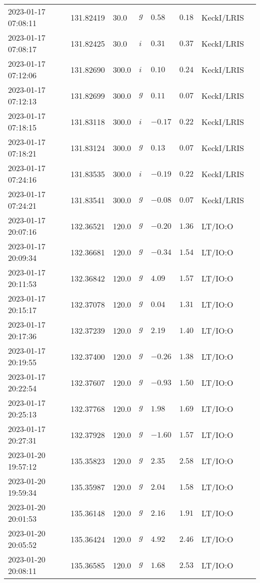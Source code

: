 \documentclass{nature_plusfigure}
\begin{document}
\begin{supplement}
\begin{center}
\begin{longtable}{llllllll}
2023-01-17 07:08:11 & 131.82419 & 30.0 & $g$ & $0.58$ & $0.18$ & KeckI/LRIS &  \\ 
2023-01-17 07:08:17 & 131.82425 & 30.0 & $i$ & $0.31$ & $0.37$ & KeckI/LRIS &  \\ 
2023-01-17 07:12:06 & 131.82690 & 300.0 & $i$ & $0.10$ & $0.24$ & KeckI/LRIS &  \\ 
2023-01-17 07:12:13 & 131.82699 & 300.0 & $g$ & $0.11$ & $0.07$ & KeckI/LRIS &  \\ 
2023-01-17 07:18:15 & 131.83118 & 300.0 & $i$ & $-0.17$ & $0.22$ & KeckI/LRIS &  \\ 
2023-01-17 07:18:21 & 131.83124 & 300.0 & $g$ & $0.13$ & $0.07$ & KeckI/LRIS &  \\ 
2023-01-17 07:24:16 & 131.83535 & 300.0 & $i$ & $-0.19$ & $0.22$ & KeckI/LRIS &  \\ 
2023-01-17 07:24:21 & 131.83541 & 300.0 & $g$ & $-0.08$ & $0.07$ & KeckI/LRIS &  \\ 
2023-01-17 20:07:16 & 132.36521 & 120.0 & $g$ & $-0.20$ & $1.36$ & LT/IO:O &  \\ 
2023-01-17 20:09:34 & 132.36681 & 120.0 & $g$ & $-0.34$ & $1.54$ & LT/IO:O &  \\ 
2023-01-17 20:11:53 & 132.36842 & 120.0 & $g$ & $4.09$ & $1.57$ & LT/IO:O &  \\ 
2023-01-17 20:15:17 & 132.37078 & 120.0 & $g$ & $0.04$ & $1.31$ & LT/IO:O &  \\ 
2023-01-17 20:17:36 & 132.37239 & 120.0 & $g$ & $2.19$ & $1.40$ & LT/IO:O &  \\ 
2023-01-17 20:19:55 & 132.37400 & 120.0 & $g$ & $-0.26$ & $1.38$ & LT/IO:O &  \\ 
2023-01-17 20:22:54 & 132.37607 & 120.0 & $g$ & $-0.93$ & $1.50$ & LT/IO:O &  \\ 
2023-01-17 20:25:13 & 132.37768 & 120.0 & $g$ & $1.98$ & $1.69$ & LT/IO:O &  \\ 
2023-01-17 20:27:31 & 132.37928 & 120.0 & $g$ & $-1.60$ & $1.57$ & LT/IO:O &  \\ 
2023-01-20 19:57:12 & 135.35823 & 120.0 & $g$ & $2.35$ & $2.58$ & LT/IO:O &  \\ 
2023-01-20 19:59:34 & 135.35987 & 120.0 & $g$ & $2.04$ & $1.58$ & LT/IO:O &  \\ 
2023-01-20 20:01:53 & 135.36148 & 120.0 & $g$ & $2.16$ & $1.91$ & LT/IO:O &  \\ 
2023-01-20 20:05:52 & 135.36424 & 120.0 & $g$ & $4.92$ & $2.46$ & LT/IO:O &  \\ 
2023-01-20 20:08:11 & 135.36585 & 120.0 & $g$ & $1.68$ & $2.53$ & LT/IO:O &  \\ 

\end{longtable}
\end{center}
\end{supplement}
\end{document}
